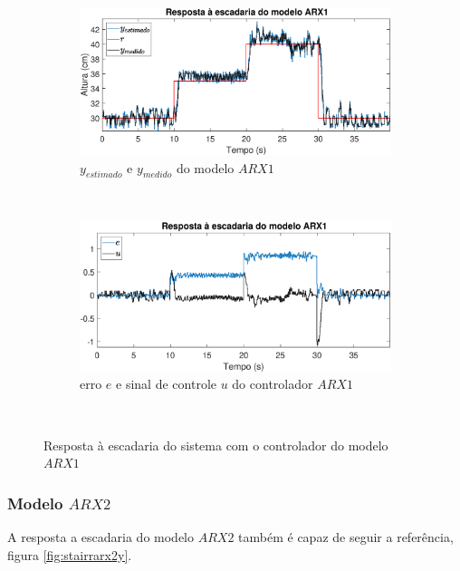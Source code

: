 \begin{figure}[htb]
	\centering
	\begin{subfigure}[t]{0.48\textwidth}
		\includegraphics[width=1\linewidth]{stairrarx1y}
		\caption[$y_{estimado}$ e $y_{medido}$ do modelo $ARX1$]{$y_{estimado}$ e $y_{medido}$ do modelo $ARX1$}
		\label{fig:stairrarx1y}
	\end{subfigure}
	~ %
	\begin{subfigure}[t]{0.48\textwidth}
		\includegraphics[width=1\linewidth]{stairrarx1e}
		\caption[erro $e$ e sinal de controle $u$ do controlador $ARX1$]{erro $e$ e sinal de controle $u$ do controlador $ARX1$}
		\label{fig:stairrarx1e}
	\end{subfigure}
	~ %
	
	\caption{Resposta à escadaria do sistema com o controlador do modelo $ARX1$}\label{fig:stairrarx1}
\end{figure}

\subsubsection{Modelo $ARX2$}
A resposta a escadaria do modelo $ARX2$ também é capaz de seguir a referência, figura \ref{fig:stairrarx2y}.

